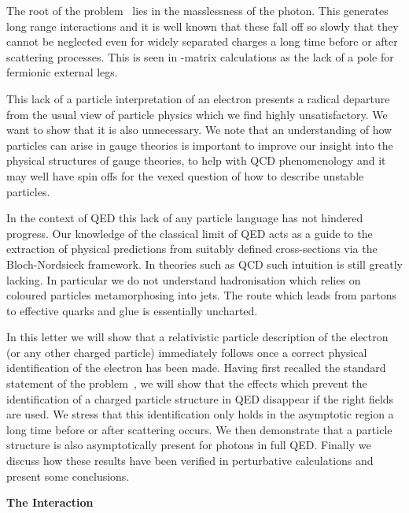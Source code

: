 \documentclass[12pt,a4paper]{article}
\providecommand{\no}{\noindent}
\begin{document}
The root of the problem~\cite{Dollard:1964} lies in the
masslessness of the photon. This generates long range interactions
and it is well known that these fall off so slowly that they
cannot be neglected even for widely separated charges a long time
before or after scattering processes. This is seen in \coordHE{}-matrix
calculations as the lack of a pole for fermionic external legs.

This lack of a particle interpretation of an electron presents a
radical departure from the usual view of particle physics which we
find highly unsatisfactory. We want to show that it is also unnecessary.
We note that an understanding of how particles can arise in gauge theories
is important to improve our insight into the physical structures of
gauge theories, to help with QCD phenomenology and it may well have spin
offs for the vexed question of how to describe unstable particles.


In the context of QED this lack of any particle language has not
hindered progress. Our knowledge of the classical limit of QED
acts as a guide to the extraction of physical predictions from
suitably defined cross-sections via the Bloch-Nordsieck framework.
In theories such as QCD such  intuition is still greatly lacking.
In particular we do not understand hadronisation which relies on
coloured particles metamorphosing into jets. The route which leads
from partons to effective quarks and glue is essentially uncharted.



In this letter we will show that a relativistic particle description  of the
electron (or any other charged particle) immediately follows once a
correct physical identification of the electron has been made. Having
first recalled the standard statement of the
problem~\cite{kulish:1970}, we will show that the effects which
prevent the identification of a charged particle structure in QED
disappear if the right fields are used. We stress that this
identification only holds in the asymptotic region a long time before
or after scattering occurs. We then demonstrate that a
particle structure is also asymptotically
present for photons in full QED. Finally we discuss how these results
have been verified in perturbative calculations and present some
conclusions.

\bigskip

\noindent \no \textbf{The Interaction}

\smallskip
\end{document}
